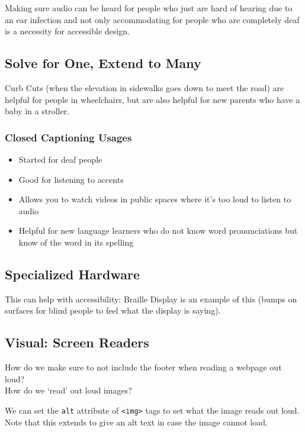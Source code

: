 \begin{shaded}
Making sure audio can be heard for people who just are hard of hearing due to an ear infection and not only accommodating for people who are completely deaf is a necessity for accessible design.
\end{shaded}

\subsection{Solve for One, Extend to Many}
Curb Cuts (when the elevation in sidewalks goes down to meet the road) are helpful for people in wheelchairs, but are also helpful for new parents who have a baby in a stroller.

\subsubsection{Closed Captioning Usages}
\begin{itemize}
    \item Started for deaf people
    \item Good for listening to accents
    \item Allows you to watch videos in public spaces where it's too loud to listen to audio
    \item Helpful for new language learners who do not know word pronunciations but know of the word in its spelling
\end{itemize}

\subsection{Specialized Hardware}
This can help with accessibility: Braille Display is an example of this (bumps on surfaces for blind people to feel what the display is saying).

\subsection{Visual: Screen Readers}
How do we make sure to not include the footer when reading a webpage out loud?\\
How do we `read' out loud images?
\begin{shaded}
    We can set the \texttt{alt} attribute of \texttt{<img>} tags to set what the image reads out loud. Note that this extends to give an alt text in case the image cannot load.
\end{shaded}

